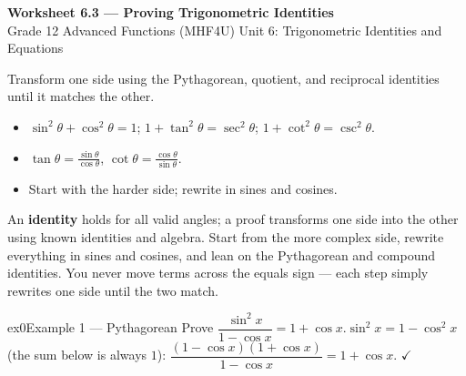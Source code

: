 \documentclass[11pt]{article}
\begin{document}
\begin{center}
{\LARGE\bfseries\color{titleblue}Worksheet 6.3 --- Proving Trigonometric Identities}\\[2pt]
{\small Grade 12 Advanced Functions (MHF4U) \textperiodcentered{} Unit 6: Trigonometric Identities and Equations}
\end{center}

\begin{ideabox}
Transform one side using the Pythagorean, quotient, and reciprocal identities until it matches the other.
\begin{itemize}[leftmargin=*,itemsep=2pt]
  \item $\sin^2\theta+\cos^2\theta=1$; $1+\tan^2\theta=\sec^2\theta$; $1+\cot^2\theta=\csc^2\theta$.
  \item $\tan\theta=\tfrac{\sin\theta}{\cos\theta}$, $\cot\theta=\tfrac{\cos\theta}{\sin\theta}$.
  \item Start with the harder side; rewrite in sines and cosines.
\end{itemize}
\end{ideabox}

\begin{learnbox}
An \textbf{identity} holds for all valid angles; a proof transforms one side into the other using known identities and algebra.
Start from the more complex side, rewrite everything in sines and cosines, and lean on the Pythagorean and compound identities.
You never move terms across the equals sign — each step simply rewrites one side until the two match.
\end{learnbox}


\begin{example}{ex0}{Example 1 --- Pythagorean}
Prove $\dfrac{\sin^2 x}{1-\cos x}=1+\cos x$.\soln $\sin^2 x=1-\cos^2 x$ (the sum below is always $1$): $\dfrac{(1-\cos x)(1+\cos x)}{1-\cos x}=1+\cos x$. $\checkmark$\begin{center}\end{center}
\end{example}
\end{document}
